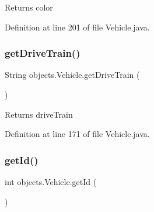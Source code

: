 \begin{DoxyReturn}{Returns}
color 
\end{DoxyReturn}


Definition at line 201 of file Vehicle.\+java.


\begin{DoxyCode}{0}

\end{DoxyCode}
\mbox{\label{classobjects_1_1_vehicle_a1695d376c5a081e9ce6e06455dc6375b}} 
\subsubsection{\texorpdfstring{getDriveTrain()}{getDriveTrain()}}
{\footnotesize\ttfamily String objects.\+Vehicle.\+get\+Drive\+Train (\begin{DoxyParamCaption}{ }\end{DoxyParamCaption})}

\begin{DoxyReturn}{Returns}
drive\+Train 
\end{DoxyReturn}


Definition at line 171 of file Vehicle.\+java.


\begin{DoxyCode}{0}

\end{DoxyCode}
\mbox{\label{classobjects_1_1_vehicle_a8b8bcc1acba6a0665f76f4e13db10110}} 
\subsubsection{\texorpdfstring{getId()}{getId()}}
{\footnotesize\ttfamily int objects.\+Vehicle.\+get\+Id (\begin{DoxyParamCaption}{ }\end{DoxyParamCaption})}

